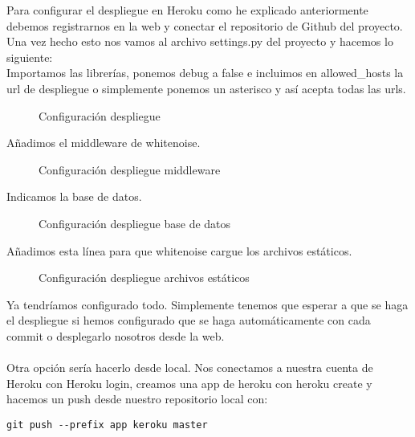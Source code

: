 Para configurar el despliegue en Heroku como he explicado anteriormente debemos registrarnos en la web y conectar el repositorio de Github del proyecto.
Una vez hecho esto nos vamos al archivo settings.py del proyecto y hacemos lo siguiente:\\
Importamos las librerías, ponemos debug a false e incluimos en allowed\_hosts la url de despliegue o simplemente ponemos un asterisco y así acepta todas las urls.

\begin{figure}[H]
  \centering
  \noindent{}
  \caption{Configuración despliegue}
\end{figure}

Añadimos el middleware de whitenoise.

\begin{figure}[H]
  \centering
  \noindent{}
  \caption{Configuración despliegue middleware}
\end{figure}

Indicamos la base de datos.

\begin{figure}[H]
  \centering
  \noindent{}
  \caption{Configuración despliegue base de datos}
\end{figure}

Añadimos esta línea para que whitenoise cargue los archivos estáticos.

\begin{figure}[H]
  \centering
  \noindent{}
  \caption{Configuración despliegue archivos estáticos}
\end{figure}

Ya tendríamos configurado todo. Simplemente tenemos que esperar a que se haga el despliegue si hemos configurado que se haga automáticamente con cada commit o desplegarlo nosotros desde la web.\\\\

Otra opción sería hacerlo desde local.
Nos conectamos a nuestra cuenta de Heroku con Heroku login, creamos una app de heroku con heroku create y hacemos un push desde nuestro repositorio local con:
\begin{lstlisting}
git push --prefix app keroku master
\end{lstlisting}

